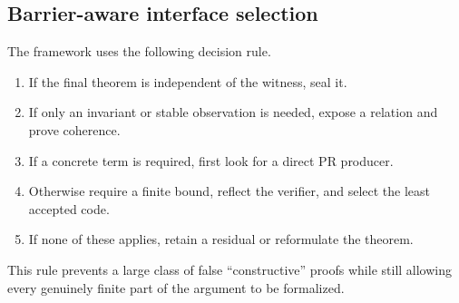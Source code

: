 \subsection{Barrier-aware interface selection}

The framework uses the following decision rule.

\begin{enumerate}[label=(\arabic*)]
\item If the final theorem is independent of the witness, seal it.
\item If only an invariant or stable observation is needed, expose a relation
  and prove coherence.
\item If a concrete term is required, first look for a direct PR producer.
\item Otherwise require a finite bound, reflect the verifier, and select the
  least accepted code.
\item If none of these applies, retain a residual or reformulate the theorem.
\end{enumerate}

This rule prevents a large class of false ``constructive'' proofs while still
allowing every genuinely finite part of the argument to be formalized.

